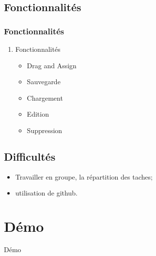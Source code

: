 \documentclass[12pt]{beamer}
\begin{document}
\subsection{Fonctionnalités}
    \begin{frame} 
    \frametitle{Fonctionnalités}
        \begin{enumerate}
            \item Fonctionnalités
            \begin{itemize}
                \item Drag and Assign
                \item Sauvegarde
                \item Chargement
                \item Edition
                \item Suppression
            \end{itemize}    
        \end{enumerate}
\end{frame}

\subsection{Difficultés}
    \begin{frame}
        \begin{itemize}
          \item Travailler en groupe, la répartition des taches;
          \item utilisation de github.
        \end{itemize}
    \end{frame}

\section{Démo}
    \begin{frame}{Démo}
    \end{frame}
\end{document}
